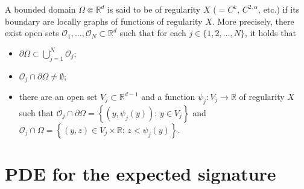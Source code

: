\documentclass[11pt,a4paper,english,reqno]{amsart}
\theoremstyle{plain}
\newtheorem{lemma}[definition]{Lemma}
\newcommand{\R}{\mathbb{R}}
\newcommand{\p}{\partial}
\newcommand{\1}{\mathbbm{1}}
\begin{document}
A bounded domain $\Omega \Subset \R^d$ is said to be of regularity $X$ ($=C^k$,  $C^{2,\alpha}$, etc.) if its boundary are locally graphs of functions of regularity $X$. More precisely, there exist open sets $\mathcal{O}_1,\ldots,\mathcal{O}_N \subset \R^d$ such that for each $j\in\{1,2,\ldots,N\}$, it holds that
\begin{itemize}
\item
$\p\Omega \subset \bigcup_{j=1}^N \mathcal{O}_j$;
    \item 
$\mathcal{O}_j \cap \p\Omega \neq \emptyset$;
    \item
there are an open set $V_j\subset \R^{d-1}$ and a function $\psi_j:V_j\to\R$ of regularity $X$ such that $\mathcal{O}_j \cap \p\Omega = \left\{(y,\psi_j(y)):\,y \in V_j \right\}$ and $\mathcal{O}_j \cap \Omega = \left\{ (y,z)\in V_j\times \R:\,z<\psi_j(y)\right\}$.
\end{itemize}

\section{PDE for the expected signature}\label{sec: lemmata}
\end{document}
